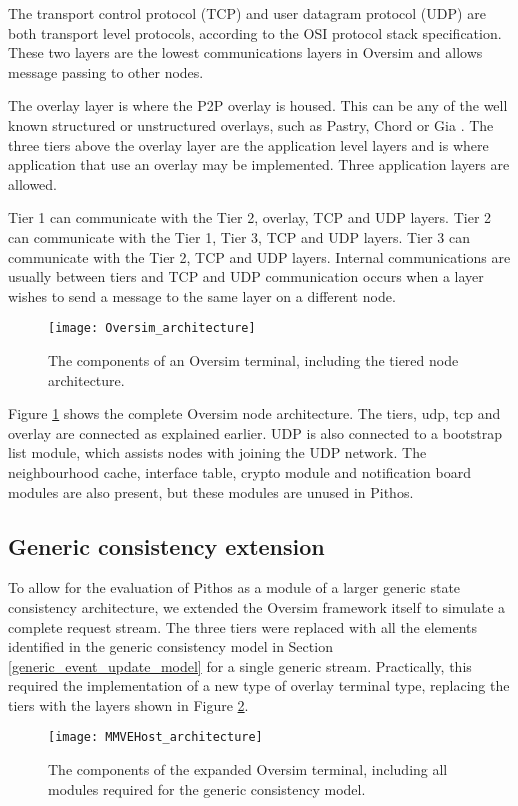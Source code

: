 The transport control protocol (TCP) and user datagram protocol (UDP) are both transport level protocols, according to the OSI protocol stack specification. These two layers are the lowest communications layers in Oversim and allows message passing to other nodes.

The overlay layer is where the P2P overlay is housed. This can be any of the well known structured or unstructured overlays, such as Pastry, Chord or Gia \cite{Chawathe_gia}. The three tiers above the overlay layer are the application level layers and is where application that use an overlay may be implemented. Three application layers are allowed.

Tier 1 can communicate with the Tier 2, overlay, TCP and UDP layers. Tier 2 can communicate with the Tier 1, Tier 3, TCP and UDP layers. Tier 3 can communicate with the Tier 2, TCP and UDP layers. Internal communications are usually between tiers and TCP and UDP communication occurs when a layer wishes to send a message to the same layer on a different node.

\begin{figure}[htbp]
 \centering
 \texttt{[image: Oversim\_architecture]}
 \caption{The components of an Oversim terminal, including the tiered node architecture.}
 \label{fig_oversim_architecture}
\end{figure}
%
Figure \ref{fig_oversim_architecture} shows the complete Oversim node architecture. The tiers, udp, tcp and overlay are connected as explained earlier. UDP is also connected to a bootstrap list module, which assists nodes with joining the UDP network. The neighbourhood cache, interface table, crypto module and notification board modules are also present, but these modules are unused in Pithos.

    \subsection{Generic consistency extension}
    \label{generic_consistency_extension}

To allow for the evaluation of Pithos as a module of a larger generic state consistency architecture, we extended the Oversim framework itself to simulate a complete request stream. The three tiers were replaced with all the elements identified in the generic consistency model in Section \ref{generic_event_update_model} for a single generic stream. Practically, this required the implementation of a new type of overlay terminal type, replacing the tiers with the layers shown in Figure \ref{fig_mmvehost_architecture}.
%
\begin{figure}[htbp]
 \centering
 \texttt{[image: MMVEHost\_architecture]}
 \caption{The components of the expanded Oversim terminal, including all modules required for the generic consistency model.}
 \label{fig_mmvehost_architecture}
\end{figure}

